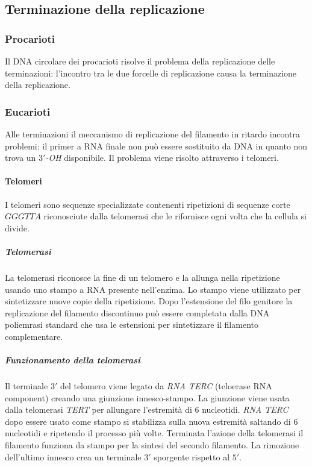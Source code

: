 	\subsection{Terminazione della replicazione}

		\subsubsection{Procarioti}
		Il DNA circolare dei procarioti risolve il problema della replicazione delle terminazioni: l'incontro tra le due forcelle di replicazione causa la terminazione della replicazione.

		\subsubsection{Eucarioti}
		Alle terminazioni il meccanismo di replicazione del filamento in ritardo incontra problemi: il primer a RNA finale non pu\`o essere sostituito da DNA in quanto non trova un \emph{$3'$-OH} disponibile.
		Il problema viene risolto attraverso i telomeri.

			\paragraph{Telomeri}
			I telomeri sono sequenze specializzate contenenti ripetizioni di sequenze corte $GGGTTA$ riconosciute dalla telomerasi che le rifornisce ogni volta che la cellula si divide.

				\subparagraph{Telomerasi}
				La telomerasi riconosce la fine di un telomero e la allunga nella ripetizione usando uno stampo a RNA presente nell'enzima.
				Lo stampo viene utilizzato per sintetizzare nuove copie della ripetizione.
				Dopo l'estensione del filo genitore la replicazione del filamento discontinuo pu\`o essere completata dalla DNA poliemrasi standard che usa le estensioni per sintetizzare il filamento complementare.

				\subparagraph{Funzionamento della telomerasi}
				Il terminale $3'$ del telomero viene legato da \emph{RNA TERC} (teloerase RNA component) creando una giunzione innesco-stampo.
				La giunzione viene usata dalla telomerasi \emph{TERT} per allungare l'estremit\`a di $6$ nucleotidi.
				\emph{RNA TERC} dopo essere usato come stampo si stabilizza sulla nuova estremit\`a saltando di $6$ nucleotidi e ripetendo il processo pi\`u volte.
				Terminata l'azione della telomerasi il filamento funziona da stampo per la sintesi del secondo filamento.
				La rimozione dell'ultimo innesco crea un terminale $3'$ sporgente rispetto al $5'$.


